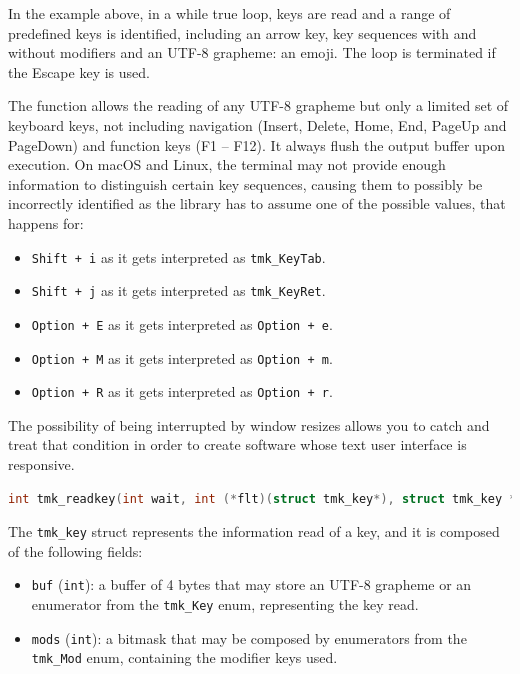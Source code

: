 \documentclass{report}
\begin{document}
In the example above, in a while true loop, keys are read and a range of predefined keys is identified, including an arrow key, key sequences with and without modifiers and an UTF-8 grapheme: an emoji. The loop is terminated if the Escape key is used.

The function allows the reading of any UTF-8 grapheme but only a limited set of keyboard keys, not including navigation (Insert, Delete, Home, End, PageUp and PageDown) and function keys (F1 – F12). It always flush the output buffer upon execution. On macOS and Linux, the terminal may not provide enough information to distinguish certain key sequences, causing them to possibly be incorrectly identified as the library has to assume one of the possible values, that happens for:
\begin{itemize}
  \item \texttt{Shift + i} as it gets interpreted as \texttt{tmk\_KeyTab}.
  \item \texttt{Shift + j} as it gets interpreted as \texttt{tmk\_KeyRet}.
  \item \texttt{Option + E} as it gets interpreted as \texttt{Option + e}.
  \item \texttt{Option + M} as it gets interpreted as \texttt{Option + m}.
  \item \texttt{Option + R} as it gets interpreted as \texttt{Option + r}.
\end{itemize}

The possibility of being interrupted by window resizes allows you to catch and treat that condition in order to create software whose text user interface is responsive.
\begin{lstlisting}[language=c,caption=the declaration of the \texttt{tmk\_readkey} function.]
int tmk_readkey(int wait, int (*flt)(struct tmk_key*), struct tmk_key *key);
\end{lstlisting}

The \texttt{tmk\_key} struct represents the information read of a key, and it is composed of the following fields:
\begin{itemize}
  \item \texttt{buf} (\texttt{int}): a buffer of 4 bytes that may store an UTF-8 grapheme or an enumerator from the \texttt{tmk\_Key} enum, representing the key read.
  \item \texttt{mods} (\texttt{int}): a bitmask that may be composed by enumerators from the \texttt{tmk\_Mod} enum, containing the modifier keys used.
\end{itemize}
\end{document}
